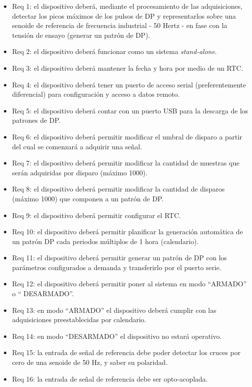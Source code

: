 \begin{itemize}
\item Req 1: el dispositivo deberá, mediante el procesamiento de las adquisiciones, detectar los picos máximos de los pulsos de DP y representarlos sobre una senoide de referencia de frecuencia industrial - 50 Hertz - en fase con la tensión de ensayo (generar un patrón de DP).
\item Req 2: el dispositivo deberá funcionar como un sistema \textit{stand-alone}.
\item Req 3: el dispositivo deberá mantener la fecha y hora por medio de un RTC.
\item Req 4: el dispositivo deberá tener un puerto de acceso serial (preferentemente diferencial) para configuración y acceso a datos remoto.
\item Req 5: el dispositivo deberá contar con un puerto USB para la descarga de los patrones de DP.
\item Req 6: el dispositivo deberá permitir modificar el umbral de disparo a partir del cual se comenzará a adquirir una señal.
\item Req 7: el dispositivo deberá permitir modificar la cantidad de muestras que serán adquiridas por disparo (máximo 1000).
\item Req 8: el dispositivo deberá permitir modificar la cantidad de disparos (máximo 1000) que componen a un patrón de DP.
\item Req 9: el dispositivo deberá permitir configurar el RTC.
\item Req 10: el dispositivo deberá permitir planificar la generación automática de un patrón DP cada periodos múltiplos de 1 hora (calendario).
\item Req 11: el dispositivo deberá permitir generar un patrón de DP con los parámetros configurados a demanda y transferirlo por el puerto serie.
\item Req 12: el dispositivo deberá permitir poner al sistema en modo “ARMADO” o “ DESARMADO”.
\item Req 13: en modo “ARMADO” el dispositivo deberá cumplir con las adquisiciones preestablecidas por calendario.
\item Req 14: en modo “DESARMADO” el dispositivo no estará operativo.
\item Req 15: la entrada de señal de referencia debe poder detectar los cruces por cero de una senoide de 50 Hz, y saber su polaridad.
\item Req 16: la entrada de señal de referencia debe ser opto-acoplada.

\end{itemize}

